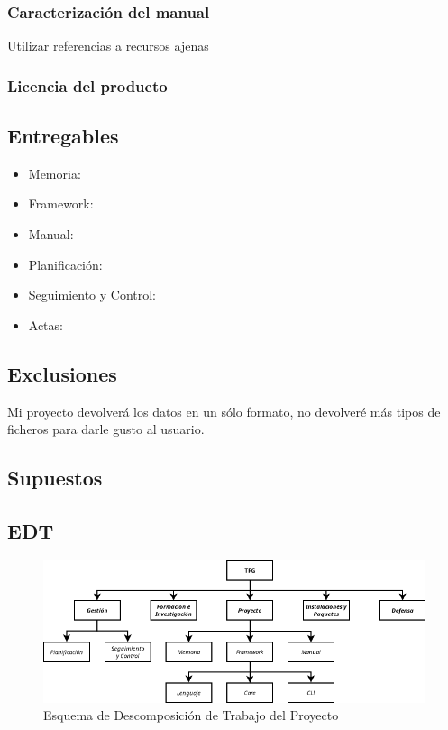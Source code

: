 \subsubsection{Caracterización del manual}
Utilizar referencias a recursos ajenas

\subsubsection{Licencia del producto}

\subsection{Entregables}

\begin{itemize}
    \item Memoria: 
    \item Framework:
    \item Manual: 
    \item Planificación: 
    \item Seguimiento y Control: 
    \item Actas: 
\end{itemize}

\subsection{Exclusiones}

Mi proyecto devolverá los datos en un sólo formato, no devolveré más tipos de
ficheros para darle gusto al usuario.

\subsection{Supuestos}

\urgent[inline]{}

\subsection{EDT}

\begin{figure}[H]
    \centering
    \includegraphics[width=\textwidth]{5-Cuerpo/Chapter1/EDT.png}
    \caption{Esquema de Descomposición de Trabajo del Proyecto}
    \label{fig:EDT}
\end{figure}